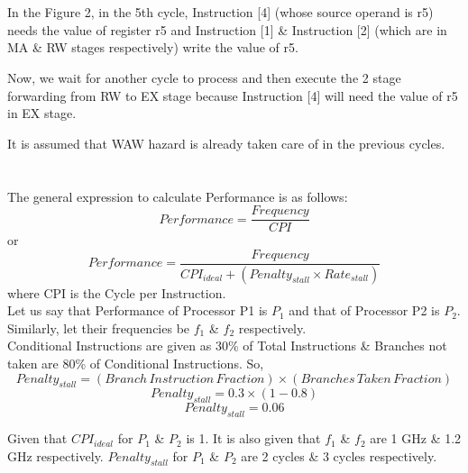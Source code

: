 \documentclass[12pt]{article}
\begin{document}
\section{}

In the Figure 2, in the 5th cycle, Instruction [4] (whose source operand is r5) needs the value of register r5 and Instruction [1] \& Instruction [2]  (which are in MA \& RW stages respectively) write the value of r5. 

Now, we wait for another cycle to process and then execute the 2 stage forwarding from RW to EX stage because Instruction [4] will need the value
of r5 in EX stage.

It is assumed that WAW hazard is already taken care of in the previous cycles.
\section{}
The general expression to calculate Performance is as follows:
\begin{equation*}
    Performance = \frac{Frequency}{CPI}
\end{equation*}
or
\begin{equation*}
    Performance = \frac{Frequency}{CPI_{ideal} + (Penalty_{stall} \times Rate_{stall})}
\end{equation*}
where CPI is the Cycle per Instruction. \\

Let us say that Performance of Processor P1 is $P_1$ and that of Processor P2 is $P_2$. Similarly, let their frequencies be $f_1$ \& $f_2$ respectively. \\

Conditional Instructions are given as 30\% of Total Instructions \& Branches not taken are 80\% of Conditional Instructions. 
So, 
\begin{equation*}
    Penalty_{stall} = (Branch \, Instruction \, Fraction) \times (Branches \, Taken \, Fraction)
\end{equation*}
\begin{equation*}
    Penalty_{stall} = 0.3 \times (1-0.8)
\end{equation*}
\begin{equation*}
    Penalty_{stall} = 0.06
\end{equation*}

Given that $CPI_{ideal}$ for $P_1$ \& $P_2$ is 1. It is also given that $f_1$ \& $f_2$ are 1 GHz \& 1.2 GHz respectively. $Penalty_{stall}$ for $P_1$ \& $P_2$ are 2 cycles \& 3 cycles respectively. \\
 
\end{document}
